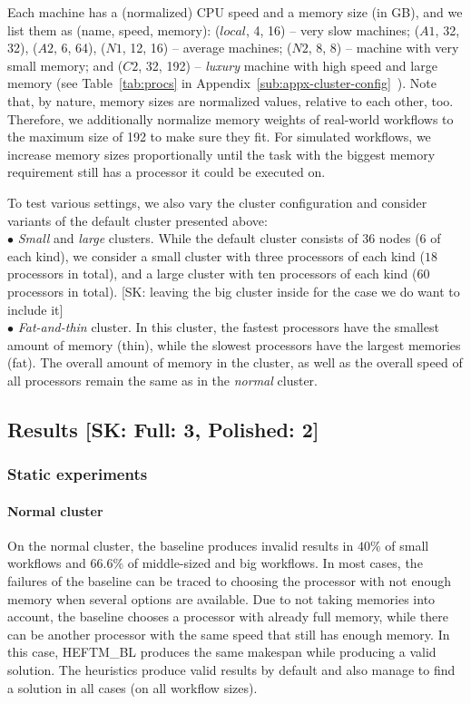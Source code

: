 \documentclass[conference]{IEEEtran}
\newcommand{\algo}[1]{\textsc{#1}}
\newcommand{\heftbl}{\algo{HEFTM\_BL}\xspace}
\newcommand{\skug}[1]{{\color{blue}[SK: #1]}}
\begin{document}
    Each machine has a (normalized) CPU speed and a memory size (in GB), and we list them as (name, speed, memory):
    ($local$, 4, 16) -- very slow machines; ($A1$, 32, 32), ($A2$, 6, 64), ($N1$, 12, 16) -- average machines; ($N2$, 8, 8) -- machine with very small memory; and ($C2$, 32, 192) -- {\em luxury} machine with high speed and large memory
    (see Table~\ref{tab:procs} in Appendix~\ref{sub:appx-cluster-config}~\cite{daghetpart_full_version}).
    Note that, by nature,
    memory sizes are normalized values, relative to each other, too.
    Therefore, we additionally normalize memory weights of real-world workflows
    to the maximum size of 192 to make sure they fit.
    For simulated workflows, we increase memory sizes proportionally until the task
    with the biggest memory requirement still
    has a processor it could be executed on.

    To test various settings, we also vary the cluster configuration and consider
    variants of the default cluster presented above:\\
    $\bullet$ {\em Small} and {\em large} clusters. While the default cluster consists of 36 nodes (6 of each kind), we
    consider a small cluster with three processors of each kind ($18$ processors in total), and a
    large cluster with ten processors of each kind ($60$ processors in total). \skug{leaving the big cluster inside for
    the case we do want to include it}\\
    $\bullet$ {\em Fat-and-thin} cluster. In this cluster, the fastest processors have the smallest amount of memory (thin),
    while the slowest processors have the largest memories (fat).
    The overall amount of memory in the cluster, as well as the overall speed of all processors remain the same as in the
            {\em normal} cluster.


    \subsection{Results \skug{Full: 3, Polished: 2}}
    \subsubsection{Static experiments}
    \paragraph{Normal cluster}

    On the normal cluster, the baseline produces invalid results in $40$\% of small workflows and $66.6$\% of middle-sized
    and big workflows.
    In most cases, the failures of the baseline can be traced to choosing the processor with not enough memory when several
    options are available.
    Due to not taking memories into account, the baseline chooses a processor with already full memory, while there can
    be another processor with the same speed that still has enough memory.
    In this case, \heftbl produces the same makespan while producing a valid solution.
    The heuristics produce valid results by default and also manage to find a solution in all cases (on all workflow sizes).
\end{document}
